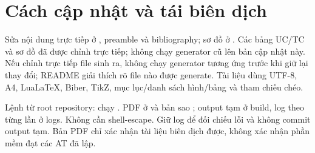 \section{Cách cập nhật và tái biên dịch}
Sửa nội dung trực tiếp ở , preamble và bibliography; sơ đồ ở . Các bảng UC/TC và sơ đồ đã được chỉnh trực tiếp; không chạy generator cũ lên bản cập nhật này. Nếu chỉnh trực tiếp file sinh ra, không chạy generator tương ứng trước khi giữ lại thay đổi; README giải thích rõ file nào được generate. Tài liệu dùng UTF-8, A4, LuaLaTeX, Biber, TikZ, mục lục/danh sách hình/bảng và tham chiếu chéo.

Lệnh từ root repository: chạy . PDF ở  và bản sao ; output tạm ở build, log theo từng lần ở logs. Không cần shell-escape. Giữ log để đối chiếu lỗi và không commit output tạm. Bản PDF chỉ xác nhận tài liệu biên dịch được, không xác nhận phần mềm đạt các AT đã lập.
